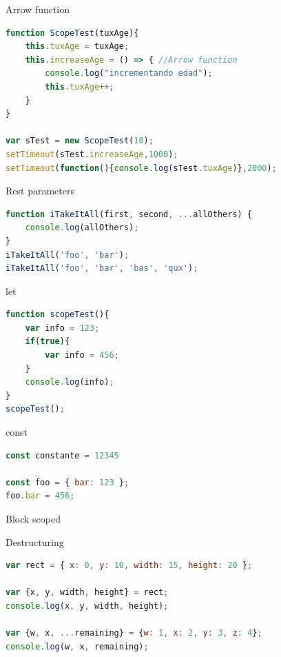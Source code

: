 \documentclass[aspectratio=169]{beamer}
\begin{document}
\begin{frame}[fragile]{Arrow function}

\begin{lstlisting}[language=JavaScript,basicstyle=\scriptsize]
function ScopeTest(tuxAge){
    this.tuxAge = tuxAge;
    this.increaseAge = () => { //Arrow function
        console.log("incrementando edad");
        this.tuxAge++;
    }
}

var sTest = new ScopeTest(10);
setTimeout(sTest.increaseAge,1000);
setTimeout(function(){console.log(sTest.tuxAge)},2000);
\end{lstlisting}
\end{frame}

\begin{frame}[fragile]{Rest parameters}

\begin{lstlisting}[language=JavaScript,basicstyle=\scriptsize]
function iTakeItAll(first, second, ...allOthers) {
    console.log(allOthers);
}
iTakeItAll('foo', 'bar');
iTakeItAll('foo', 'bar', 'bas', 'qux');
\end{lstlisting}
\end{frame}

\begin{frame}[fragile]{let}

 \begin{lstlisting}[language=JavaScript,basicstyle=\scriptsize]
function scopeTest(){
    var info = 123;
    if(true){
        var info = 456;
    }
    console.log(info);
}
scopeTest();
 \end{lstlisting}
\end{frame}

\begin{frame}[fragile]{const}

\begin{lstlisting}[language=JavaScript,basicstyle=\scriptsize]
const constante = 12345

const foo = { bar: 123 };
foo.bar = 456;
\end{lstlisting}

Block scoped
\end{frame}

\begin{frame}[fragile]{Destructuring}

\begin{lstlisting}[language=JavaScript,basicstyle=\scriptsize]
var rect = { x: 0, y: 10, width: 15, height: 20 };

var {x, y, width, height} = rect;
console.log(x, y, width, height);

var {w, x, ...remaining} = {w: 1, x: 2, y: 3, z: 4};
console.log(w, x, remaining);
\end{lstlisting}
\end{frame}
\end{document}
